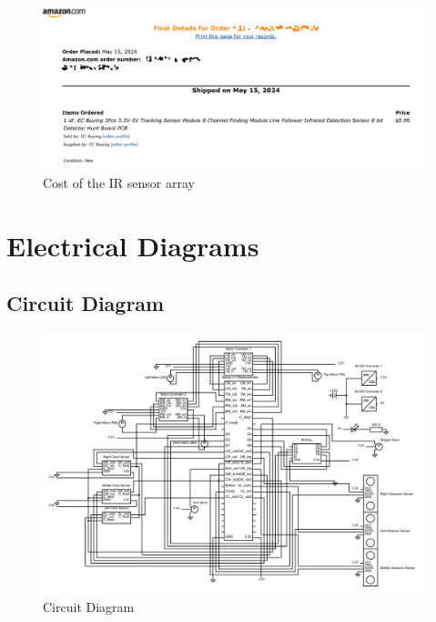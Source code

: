 \documentclass[12pt]{report}
\begin{document}
\begin{figure}[H]
    \centering
    \includegraphics[width=1\textwidth]{Images/Cost/ir_cost.pdf}
    \caption{Cost of the \gls{IR} sensor array}
    \label{fig:enter-label}
\end{figure}

\section{Electrical Diagrams}
\subsection{Circuit Diagram}
\begin{figure}[H]
    \centering
    \includegraphics[width = 1.1\textwidth,angle=270, keepaspectratio]{Images/Diagrams/robot_pinout.pdf}
    \caption{Circuit Diagram}
    \label{fig:CircuitDiagram}
\end{figure}
\end{document}
